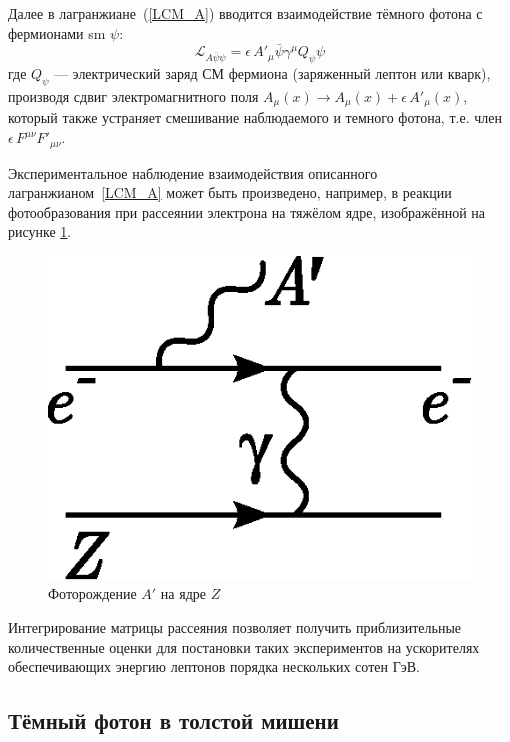 
Далее в лагранжиане~(\ref{LCM_A}) вводится взаимодействие тёмного 
фотона с фермионами \acrshort{sm} $\psi$:
\begin{equation}
\label{L_Apsi}
    \mathcal{L}_{A\bar\psi\psi} = \epsilon \, A'_\mu  
    \bar\psi \gamma^\mu Q_\psi \psi 
\end{equation}
где $Q_\psi$ --- электрический заряд СМ фермиона (заряженный лептон или кварк), 
производя сдвиг электромагнитного поля 
$A_\mu(x) \to A_\mu(x) + \epsilon \, A'_\mu(x)$, который также устраняет 
смешивание наблюдаемого и темного фотона, т.е. член 
$\epsilon \, F^{\mu\nu} F'_{\mu \nu}$.

Экспериментальное наблюдение взаимодействия описанного
лагранжианом~\eqref{LCM_A} может быть произведено, например,
в реакции фотообразования при рассеянии
электрона на тяжёлом ядре, изображённой на рисунке \ref{fig:aprime-production}.
\begin{figure}[ht]
    \centering
    \includegraphics[width=.2\linewidth]{images/illustrative/aprime-photoprod.eps}
    \caption{Фоторождение $A'$ на ядре $Z$}
    \label{fig:aprime-production}
\end{figure}
Интегрирование матрицы рассеяния позволяет получить приблизительные
количественные оценки для постановки таких экспериментов на
ускорителях обеспечивающих энергию лептонов порядка
нескольких сотен ГэВ.

\subsection{Тёмный фотон в толстой мишени}

